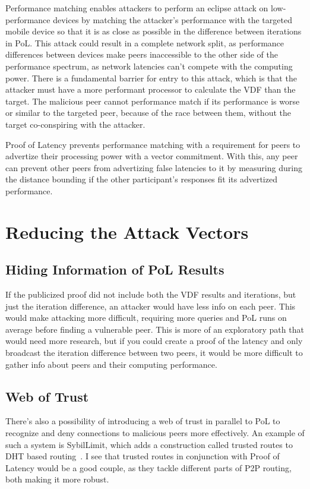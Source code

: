 Performance matching enables attackers to perform an eclipse attack on low-performance devices by matching the attacker's performance with the targeted mobile device so that it is as close as possible in the difference between iterations in PoL. This attack could result in a complete network split, as performance differences between devices make peers inaccessible to the other side of the performance spectrum, as network latencies can't compete with the computing power. There is a fundamental barrier for entry to this attack, which is that the attacker must have a more performant processor to calculate the VDF than the target. The malicious peer cannot performance match if its performance is worse or similar to the targeted peer, because of the race between them, without the target co-conspiring with the attacker.

Proof of Latency prevents performance matching with a requirement for peers to advertize their processing power with a vector commitment. With this, any peer can prevent other peers from advertizing false latencies to it by measuring during the distance bounding if the other participant's responses fit its advertized performance.

\section{Reducing the Attack Vectors}
\subsection{Hiding Information of PoL Results}
If the publicized proof did not include both the VDF results and iterations, but just the iteration difference, an attacker would have less info on each peer. This would make attacking more difficult, requiring more queries and PoL runs on average before finding a vulnerable peer. This is more of an exploratory path that would need more research, but if you could create a proof of the latency and only broadcast the iteration difference between two peers, it would be more difficult to gather info about peers and their computing performance.

\subsection{Web of Trust}
There's also a possibility of introducing a web of trust in parallel to PoL to recognize and deny connections to malicious peers more effectively. An example of such a system is SybilLimit, which adds a construction called trusted routes to DHT based routing~\cite{Yu2008-xl}. I see that trusted routes in conjunction with Proof of Latency would be a good couple, as they tackle different parts of P2P routing, both making it more robust.

